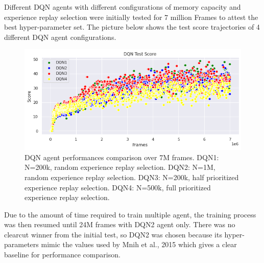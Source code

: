 \documentclass{article}
\begin{document}
Different DQN agents with different configurations of memory capacity and experience replay selection were initially tested for 7 million Frames to attest the best hyper-parameter set. The picture below shows the test score trajectories of 4 different DQN agent configurations.
\begin{figure}[H]
\centering
\includegraphics[scale=0.5]{DQNAgentComparison.PNG}
\caption{DQN agent performances comparison over 7M frames. DQN1: N=200k, random experience replay selection. DQN2: N=1M, random experience replay selection. DQN3: N=200k, half prioritized experience replay selection. DQN4: N=500k, full prioritized experience replay selection.}
\label{fig:DQNAgentComparison}
\end{figure}

Due to the amount of time required to train multiple agent, the training process was then resumed until 24M frames with DQN2 agent only. There was no clearcut winner from the initial test, so DQN2 was chosen because its hyper-parameters mimic the values used by Mnih et al., 2015 which gives a clear baseline for performance comparison.
\end{document}
